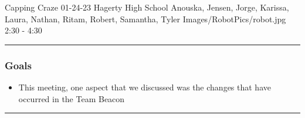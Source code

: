 \insertmeeting 
	{Capping Craze} 
	{01-24-23} 
	{Hagerty High School}
	{Anouska, Jensen, Jorge, Karissa, Laura, Nathan, Ritam, Robert, Samantha, Tyler}
	{Images/RobotPics/robot.jpg}
	{2:30 - 4:30}
	
\noindent\hfil\rule{\textwidth}{.4pt}\hfil
\subsubsection*{Goals}
\begin{itemize}
    \item This meeting, one aspect that we discussed was the changes that have occurred in the Team Beacon 

\end{itemize} 

\noindent\hfil\rule{\textwidth}{.4pt}\hfil

